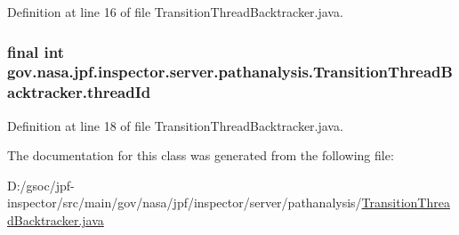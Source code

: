 Definition at line 16 of file Transition\+Thread\+Backtracker.\+java.

\subsubsection[{\texorpdfstring{thread\+Id}{threadId}}]{\setlength{\rightskip}{0pt plus 5cm}final int gov.\+nasa.\+jpf.\+inspector.\+server.\+pathanalysis.\+Transition\+Thread\+Backtracker.\+thread\+Id\hspace{0.3cm}{\ttfamily [private]}}\hypertarget{classgov_1_1nasa_1_1jpf_1_1inspector_1_1server_1_1pathanalysis_1_1_transition_thread_backtracker_ab5825d940eb7057fe8f2493e2c9baa14}{}\label{classgov_1_1nasa_1_1jpf_1_1inspector_1_1server_1_1pathanalysis_1_1_transition_thread_backtracker_ab5825d940eb7057fe8f2493e2c9baa14}


Definition at line 18 of file Transition\+Thread\+Backtracker.\+java.



The documentation for this class was generated from the following file\+:\begin{DoxyCompactItemize}
\item 
D\+:/gsoc/jpf-\/inspector/src/main/gov/nasa/jpf/inspector/server/pathanalysis/\hyperlink{_transition_thread_backtracker_8java}{Transition\+Thread\+Backtracker.\+java}\end{DoxyCompactItemize}
